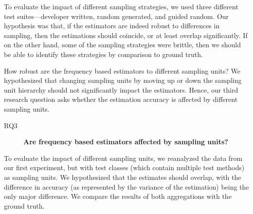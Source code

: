 \documentclass[sigconf,review,anonymous]{acmart}
\begin{document}
To evaluate the impact of different sampling strategies, we used three different
test suites---developer written, random generated, and guided random.
Our hypothesis was that, if the estimators are indeed robust to differences in
sampling, then the estimations should coincide, or at least overlap
significantly. If on the other hand, some of the sampling strategies were
brittle, then we should be able to identify these strategies by comparison
to ground truth.

How robust are the frequency based estimators to different sampling units? We
hypothesized that changing sampling units by moving up or down the sampling unit
hierarchy should not significantly impact the estimators.
Hence, our third research question asks whether the estimation
accuracy is affected by different sampling units.

\begin{description}
  \item[RQ3] \textbf{Are frequency based estimators affected by sampling units?}%
\end{description}

To evaluate the impact of different sampling units, we reanalyzed the
data from our first experiment, but with test classes (which contain multiple
test methods) as sampling units.
We hypothesized that the estimates should overlap, with the difference in
accuracy (as represented by the variance of the estimation) being the only major
difference. We compare the results of both aggregations with the ground truth.






\end{document}
